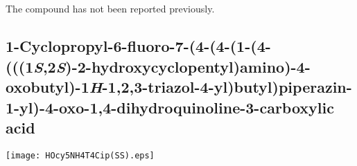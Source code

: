 \\[1\baselineskip]
\\[1\baselineskip]
\\[1\baselineskip]
\\[1\baselineskip]
The compound has not been reported previously.

\subsection{1\hyp{}Cyclopropyl\hyp{}6\hyp{}fluoro\hyp{}7\hyp{}(4\hyp{}(4\hyp{}(1\hyp{}(4\hyp{}(((1\textit{S},2\textit{S})\hyp{}2\hyp{}hydroxycyclopentyl)amino)\hyp{}4\hyp{}oxobutyl)\hyp{}1\textit{H}\hyp{}1,2,3\hyp{}triazol\hyp{}4\hyp{}yl)butyl)piperazin\hyp{}1\hyp{}yl)\hyp{}4\hyp{}oxo\hyp{}1,4\hyp{}dihydroqu\allowbreak i\allowbreak n\allowbreak oline\hyp{}3\hyp{}carboxylic acid }


\begin{scheme}[H]
	\begin{center}
		\texttt{[image: HOcy5NH4T4Cip(SS).eps]}
	\end{center}
\end{scheme}

